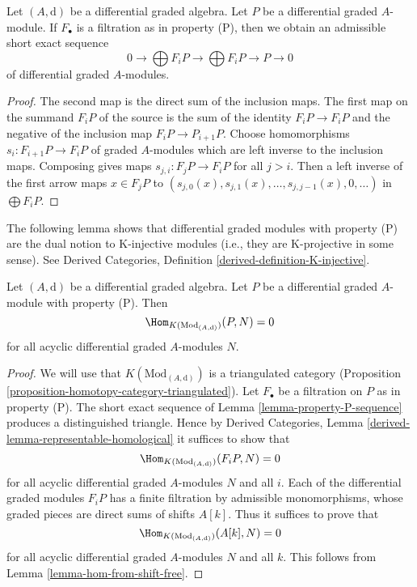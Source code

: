 \begin{lemma}
\label{lemma-property-P-sequence}
Let $(A, \text{d})$ be a differential graded algebra.
Let $P$ be a differential graded $A$-module. If $F_\bullet$
is a filtration as in property (P), then we obtain an
admissible short exact sequence
$$
0 \to
\bigoplus\nolimits F_iP \to
\bigoplus\nolimits F_iP \to P \to 0
$$
of differential graded $A$-modules.
\end{lemma}

\begin{proof}
The second map is the direct sum of the inclusion maps.
The first map on the summand $F_iP$ of the source is the sum
of the identity $F_iP \to F_iP$ and the negative of the inclusion
map $F_iP \to P_{i + 1}P$. Choose homomorphisms $s_i : F_{i + 1}P \to F_iP$
of graded $A$-modules which are left inverse to the inclusion maps.
Composing gives maps $s_{j, i} : F_jP \to F_iP$ for all $j > i$.
Then a left inverse of the first arrow maps $x \in F_jP$ to
$(s_{j, 0}(x), s_{j, 1}(x), \ldots, s_{j, j - 1}(x), 0, \ldots)$
in $\bigoplus F_iP$.
\end{proof}

\noindent
The following lemma shows that differential graded modules with
property (P) are the dual notion to K-injective modules
(i.e., they are K-projective in some sense). See
Derived Categories, Definition \ref{derived-definition-K-injective}.

\begin{lemma}
\label{lemma-property-P-K-projective}
Let $(A, \text{d})$ be a differential graded algebra.
Let $P$ be a differential graded $A$-module with property (P).
Then
$$
\Hom_{K(\text{Mod}_{(A, \text{d})})}(P, N) = 0
$$
for all acyclic differential graded $A$-modules $N$.
\end{lemma}

\begin{proof}
We will use that $K(\text{Mod}_{(A, \text{d})})$ is a triangulated
category (Proposition \ref{proposition-homotopy-category-triangulated}).
Let $F_\bullet$ be a filtration on $P$ as in property (P).
The short exact sequence of Lemma \ref{lemma-property-P-sequence}
produces a distinguished triangle. Hence by
Derived Categories, Lemma \ref{derived-lemma-representable-homological}
it suffices to show that
$$
\Hom_{K(\text{Mod}_{(A, \text{d})})}(F_iP, N) = 0
$$
for all acyclic differential graded $A$-modules $N$ and all $i$.
Each of the differential graded modules $F_iP$ has a finite filtration
by admissible monomorphisms, whose graded pieces are direct sums
of shifts $A[k]$. Thus it suffices to prove that
$$
\Hom_{K(\text{Mod}_{(A, \text{d})})}(A[k], N) = 0
$$
for all acyclic differential graded $A$-modules $N$ and all $k$.
This follows from Lemma \ref{lemma-hom-from-shift-free}.
\end{proof}

